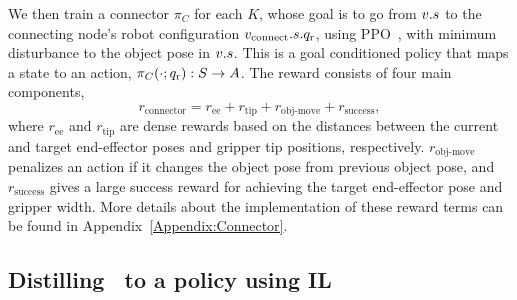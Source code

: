 
We then train a connector $\pi_C$ for each $K$, whose goal is to go from $v.s$ to the connecting node's robot configuration $v_{\text{connect}}.s.q_\text{r}$, using PPO~\cite{schulman2017proximal}, with minimum disturbance to the object pose in $v.s$. This is a goal conditioned policy that maps a state to an action, $\pi_C(\cdot;q_\text{r}): S \rightarrow A$. The reward consists of four main components,
\[
    r_{\text{connector}} = r_{\text{ee}} + r_{\text{tip}} + r_{\text{obj-move}} + r_{\text{success}},
\]
where $r_{\text{ee}}$ and $r_{\text{tip}}$ are dense rewards based on the distances between the current and target end-effector poses and gripper tip positions, respectively. $r_{\text{obj-move}}$ penalizes an action if it changes the object pose from previous object pose, and $r_{\text{success}}$ gives a large success reward for achieving the target end-effector pose and gripper width. More details about the implementation of these reward terms can be found in Appendix~\ref{Appendix:Connector}.





\subsection{Distilling \skillrrt~to a policy using IL}\label{method:IL}


